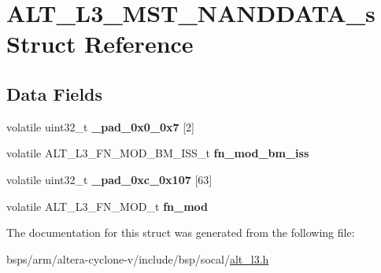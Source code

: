 \hypertarget{structALT__L3__MST__NANDDATA__s}{}\section{A\+L\+T\+\_\+\+L3\+\_\+\+M\+S\+T\+\_\+\+N\+A\+N\+D\+D\+A\+T\+A\+\_\+s Struct Reference}
\label{structALT__L3__MST__NANDDATA__s}
\subsection*{Data Fields}
\begin{DoxyCompactItemize}
\item 
\mbox{\label{structALT__L3__MST__NANDDATA__s_a15c140934ef1b6e8c13de364a013d027}} 
volatile uint32\+\_\+t {\bfseries \+\_\+pad\+\_\+0x0\+\_\+0x7} \mbox{[}2\mbox{]}
\item 
\mbox{\label{structALT__L3__MST__NANDDATA__s_a6612b4207d623c3a67608856da5732af}} 
volatile A\+L\+T\+\_\+\+L3\+\_\+\+F\+N\+\_\+\+M\+O\+D\+\_\+\+B\+M\+\_\+\+I\+S\+S\+\_\+t {\bfseries fn\+\_\+mod\+\_\+bm\+\_\+iss}
\item 
\mbox{\label{structALT__L3__MST__NANDDATA__s_a79efb6b8c8613542035453feb4547e19}} 
volatile uint32\+\_\+t {\bfseries \+\_\+pad\+\_\+0xc\+\_\+0x107} \mbox{[}63\mbox{]}
\item 
\mbox{\label{structALT__L3__MST__NANDDATA__s_a45a519b549399664eec4340828945a04}} 
volatile A\+L\+T\+\_\+\+L3\+\_\+\+F\+N\+\_\+\+M\+O\+D\+\_\+t {\bfseries fn\+\_\+mod}
\end{DoxyCompactItemize}


The documentation for this struct was generated from the following file\+:\begin{DoxyCompactItemize}
\item 
bsps/arm/altera-\/cyclone-\/v/include/bsp/socal/\mbox{\hyperlink{alt__l3_8h}{alt\+\_\+l3.\+h}}\end{DoxyCompactItemize}
